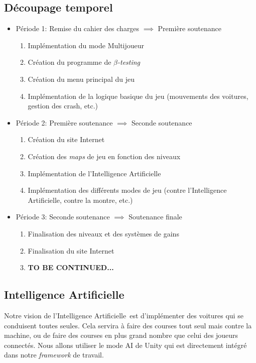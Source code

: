 \documentclass[11pt,a4paper]{article}
\newcommand{\AI}{Intelligence Artificielle}
\begin{document}
  \subsection{Découpage temporel}
    \begin{itemize}
      \item Période 1: Remise du cahier des charges \(\implies\) Première soutenance
        \begin{enumerate}
          \item Implémentation du mode Multijoueur
          \item Création du programme de \(\beta\)\textit{-testing}
          \item Création du menu principal du jeu
          \item Implémentation de la logique basique du jeu (mouvements des voitures, gestion des crash, etc.)
        \end{enumerate}
      \item Période 2: Première soutenance \(\implies\) Seconde soutenance
        \begin{enumerate}
          \item Création du site Internet
          \item Création des \textit{maps} de jeu en fonction des niveaux
          \item Implémentation de l'\AI
          \item Implémentation des différents modes de jeu (contre l'\AI, contre la montre, etc.)
        \end{enumerate}
      \item Période 3: Seconde soutenance \(\implies\) Soutenance finale
        \begin{enumerate}
          \item Finalisation des niveaux et des systèmes de gains
          \item Finalisation du site Internet
          \item \textbf{TO BE CONTINUED...}
        \end{enumerate}
    \end{itemize}
  \subsection{\AI}
    Notre vision de l'\AI\, est d'implémenter des voitures qui se conduisent toutes seules.
    Cela servira à faire des courses tout seul mais contre la machine, ou de faire des courses en plus grand
    nombre que celui des joueurs connectés. Nous allons utiliser le mode AI de Unity qui est directement intégré
    dans notre \textit{framework} de travail.
\end{document}
